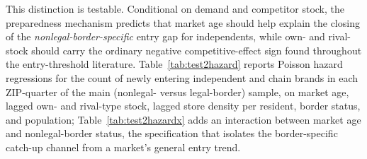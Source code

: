 \documentclass[english,12pt]{article}
\begin{document}
This distinction is testable. Conditional on demand and competitor stock, the preparedness mechanism predicts that market age should help explain the closing of the \emph{nonlegal-border-specific} entry gap for independents, while own- and rival-stock should carry the ordinary negative competitive-effect sign found throughout the entry-threshold literature. Table~\ref{tab:test2hazard} reports Poisson hazard regressions for the count of newly entering independent and chain brands in each ZIP-quarter of the main (nonlegal- versus legal-border) sample, on market age, lagged own- and rival-type stock, lagged store density per resident, border status, and population; Table~\ref{tab:test2hazardx} adds an interaction between market age and nonlegal-border status, the specification that isolates the border-specific catch-up channel from a market's general entry trend.

\begin{table}[htbp]
\centering\footnotesize

\caption{New independent and chain brand entries by ZIP-quarter, Poisson hazard, main (nonlegal- vs.\ legal-border) sample, county-clustered standard errors. Market age and lagged own/rival stock and density are mechanically collinear with the overall pace of market-wide entry, discussed in the text.}
\label{tab:test2hazard}
\end{table}

\begin{table}[htbp]
\centering\footnotesize

\caption{Same specification as Table~\ref{tab:test2hazard}, with market age interacted with nonlegal-border status, isolating the border-specific timing channel from the market-wide entry trend.}
\label{tab:test2hazardx}
\end{table}
\end{document}
